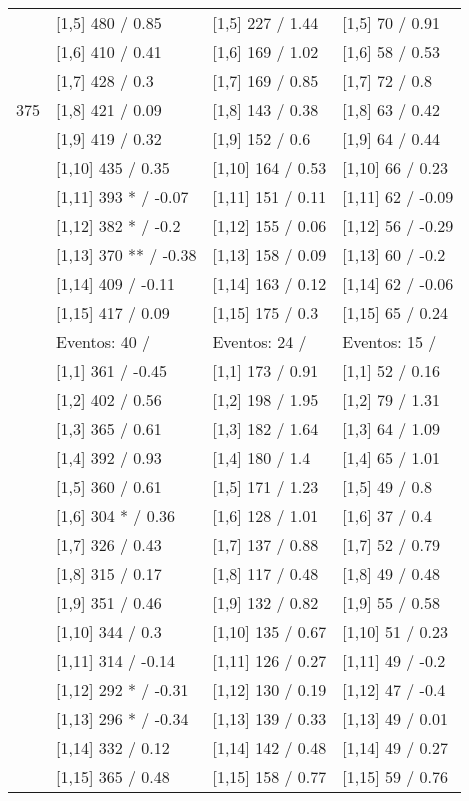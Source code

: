 \begin{table}
\begin{tabular}[t]{llll}
 & {}[1,5] 480  / 0.85 & {}[1,5] 227  / 1.44 & {}[1,5] 70  / 0.91\\
 & {}[1,6] 410  / 0.41 & {}[1,6] 169  / 1.02 & {}[1,6] 58  / 0.53\\
 & {}[1,7] 428  / 0.3 & {}[1,7] 169  / 0.85 & {}[1,7] 72  / 0.8\\
375 & {}[1,8] 421  / 0.09 & {}[1,8] 143  / 0.38 & {}[1,8] 63  / 0.42\\
\addlinespace
 & {}[1,9] 419  / 0.32 & {}[1,9] 152  / 0.6 & {}[1,9] 64  / 0.44\\
 & {}[1,10] 435  / 0.35 & {}[1,10] 164  / 0.53 & {}[1,10] 66  / 0.23\\
 & {}[1,11] 393 * / -0.07 & {}[1,11] 151  / 0.11 & {}[1,11] 62  / -0.09\\
 & {}[1,12] 382 * / -0.2 & {}[1,12] 155  / 0.06 & {}[1,12] 56  / -0.29\\
 & {}[1,13] 370 ** / -0.38 & {}[1,13] 158  / 0.09 & {}[1,13] 60  / -0.2\\
\addlinespace
 & {}[1,14] 409  / -0.11 & {}[1,14] 163  / 0.12 & {}[1,14] 62  / -0.06\\
 & {}[1,15] 417  / 0.09 & {}[1,15] 175  / 0.3 & {}[1,15] 65  / 0.24\\
 & Eventos:  40 / & Eventos:  24 / & Eventos:  15 /\\
 & {}[1,1] 361  / -0.45 & {}[1,1] 173  / 0.91 & {}[1,1] 52  / 0.16\\
 & {}[1,2] 402  / 0.56 & {}[1,2] 198  / 1.95 & {}[1,2] 79  / 1.31\\
\addlinespace
 & {}[1,3] 365  / 0.61 & {}[1,3] 182  / 1.64 & {}[1,3] 64  / 1.09\\
 & {}[1,4] 392  / 0.93 & {}[1,4] 180  / 1.4 & {}[1,4] 65  / 1.01\\
 & {}[1,5] 360  / 0.61 & {}[1,5] 171  / 1.23 & {}[1,5] 49  / 0.8\\
 & {}[1,6] 304 * / 0.36 & {}[1,6] 128  / 1.01 & {}[1,6] 37  / 0.4\\
 & {}[1,7] 326  / 0.43 & {}[1,7] 137  / 0.88 & {}[1,7] 52  / 0.79\\
\addlinespace
500 & {}[1,8] 315  / 0.17 & {}[1,8] 117  / 0.48 & {}[1,8] 49  / 0.48\\
 & {}[1,9] 351  / 0.46 & {}[1,9] 132  / 0.82 & {}[1,9] 55  / 0.58\\
 & {}[1,10] 344  / 0.3 & {}[1,10] 135  / 0.67 & {}[1,10] 51  / 0.23\\
 & {}[1,11] 314  / -0.14 & {}[1,11] 126  / 0.27 & {}[1,11] 49  / -0.2\\
 & {}[1,12] 292 * / -0.31 & {}[1,12] 130  / 0.19 & {}[1,12] 47  / -0.4\\
\addlinespace
 & {}[1,13] 296 * / -0.34 & {}[1,13] 139  / 0.33 & {}[1,13] 49  / 0.01\\
 & {}[1,14] 332  / 0.12 & {}[1,14] 142  / 0.48 & {}[1,14] 49  / 0.27\\
 & {}[1,15] 365  / 0.48 & {}[1,15] 158  / 0.77 & {}[1,15] 59  / 0.76\\
\bottomrule
\end{tabular}
\end{table}
